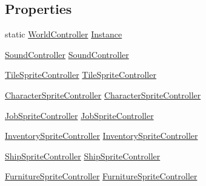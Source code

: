 \subsection*{Properties}
\begin{DoxyCompactItemize}
\item 
static \hyperlink{class_world_controller}{World\+Controller} \hyperlink{class_world_controller_a69fb8eed57398b337b0604f49f7dbb2d}{Instance}
\item 
\hyperlink{class_sound_controller}{Sound\+Controller} \hyperlink{class_world_controller_aefca92e9db3022e5a5aa7c624f19b931}{Sound\+Controller}
\item 
\hyperlink{class_tile_sprite_controller}{Tile\+Sprite\+Controller} \hyperlink{class_world_controller_aec5ca660778fb0c9b13154804e63a9a5}{Tile\+Sprite\+Controller}
\item 
\hyperlink{class_project_porcupine_1_1_entities_1_1_character_sprite_controller}{Character\+Sprite\+Controller} \hyperlink{class_world_controller_acfb5f356950156713748bbba8d318cb2}{Character\+Sprite\+Controller}
\item 
\hyperlink{class_job_sprite_controller}{Job\+Sprite\+Controller} \hyperlink{class_world_controller_a614511147eb8e2069dff19ac843a64a0}{Job\+Sprite\+Controller}
\item 
\hyperlink{class_inventory_sprite_controller}{Inventory\+Sprite\+Controller} \hyperlink{class_world_controller_a97eba6acd6f89973bbd072d65436c7d0}{Inventory\+Sprite\+Controller}
\item 
\hyperlink{class_ship_sprite_controller}{Ship\+Sprite\+Controller} \hyperlink{class_world_controller_a3e1d3be982c9f45b87510dcfad807986}{Ship\+Sprite\+Controller}
\item 
\hyperlink{class_furniture_sprite_controller}{Furniture\+Sprite\+Controller} \hyperlink{class_world_controller_ab9c8d1512187f0e755ed798a6a98c666}{Furniture\+Sprite\+Controller}

\end{DoxyCompactItemize}

